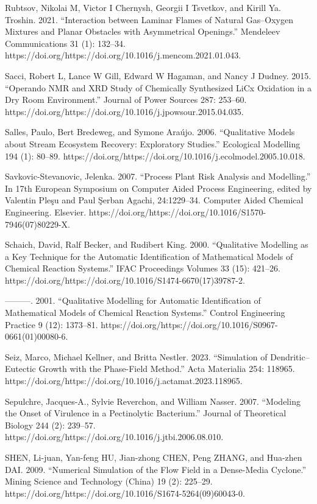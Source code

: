 \documentclass[utf8]{gradu3}
\begin{document}
Rubtsov, Nikolai M, Victor I Chernysh, Georgii I Tsvetkov, and Kirill Ya. Troshin. 2021. “Interaction between Laminar Flames of Natural Gas–Oxygen Mixtures and Planar Obstacles with Asymmetrical Openings.” Mendeleev Communications 31 (1): 132–34. https://doi.org/https://doi.org/10.1016/j.mencom.2021.01.043.

Sacci, Robert L, Lance W Gill, Edward W Hagaman, and Nancy J Dudney. 2015. “Operando NMR and XRD Study of Chemically Synthesized LiCx Oxidation in a Dry Room Environment.” Journal of Power Sources 287: 253–60. https://doi.org/https://doi.org/10.1016/j.jpowsour.2015.04.035.

Salles, Paulo, Bert Bredeweg, and Symone Araújo. 2006. “Qualitative Models about Stream Ecosystem Recovery: Exploratory Studies.” Ecological Modelling 194 (1): 80–89. https://doi.org/https://doi.org/10.1016/j.ecolmodel.2005.10.018.

Savkovic-Stevanovic, Jelenka. 2007. “Process Plant Risk Analysis and Modelling.” In 17th European Symposium on Computer Aided Process Engineering, edited by Valentin Pleşu and Paul Şerban Agachi, 24:1229–34. Computer Aided Chemical Engineering. Elsevier. https://doi.org/https://doi.org/10.1016/S1570-7946(07)80229-X.

Schaich, David, Ralf Becker, and Rudibert King. 2000. “Qualitative Modelling as a Key Technique for the Automatic Identification of Mathematical Models of Chemical Reaction Systems.” IFAC Proceedings Volumes 33 (15): 421–26. https://doi.org/https://doi.org/10.1016/S1474-6670(17)39787-2.

———. 2001. “Qualitative Modelling for Automatic Identification of Mathematical Models of Chemical Reaction Systems.” Control Engineering Practice 9 (12): 1373–81. https://doi.org/https://doi.org/10.1016/S0967-0661(01)00080-6.

Seiz, Marco, Michael Kellner, and Britta Nestler. 2023. “Simulation of Dendritic–Eutectic Growth with the Phase-Field Method.” Acta Materialia 254: 118965. https://doi.org/https://doi.org/10.1016/j.actamat.2023.118965.

Sepulchre, Jacques-A., Sylvie Reverchon, and William Nasser. 2007. “Modeling the Onset of Virulence in a Pectinolytic Bacterium.” Journal of Theoretical Biology 244 (2): 239–57. https://doi.org/https://doi.org/10.1016/j.jtbi.2006.08.010.

SHEN, Li-juan, Yan-feng HU, Jian-zhong CHEN, Peng ZHANG, and Hua-zhen DAI. 2009. “Numerical Simulation of the Flow Field in a Dense-Media Cyclone.” Mining Science and Technology (China) 19 (2): 225–29. https://doi.org/https://doi.org/10.1016/S1674-5264(09)60043-0.
\end{document}
